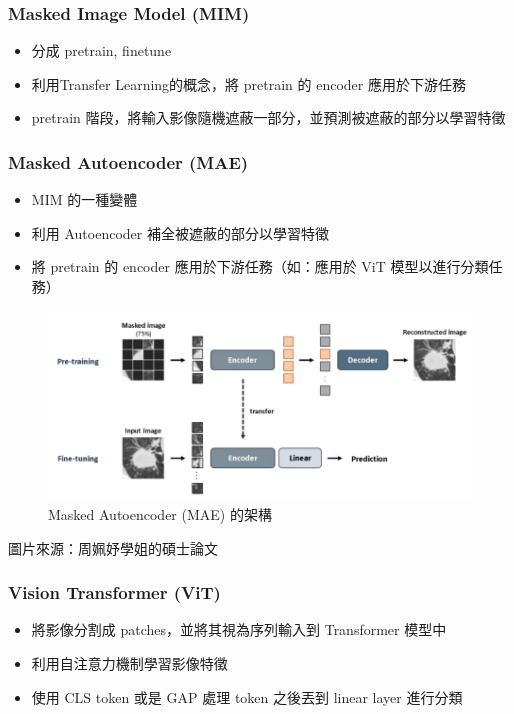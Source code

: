 \documentclass[xcolor=dvipsnames]{beamer}
\begin{document}
    \begin{frame}
        \frametitle{Masked Image Model (MIM)}
        \begin{itemize}
            \item 分成 pretrain, finetune
            \item 利用Transfer Learning的概念，將 pretrain 的 encoder 應用於下游任務
            \item pretrain 階段，將輸入影像隨機遮蔽一部分，並預測被遮蔽的部分以學習特徵
        \end{itemize}
    \end{frame}

    \begin{frame}
        \frametitle{Masked Autoencoder (MAE)}
        \begin{itemize}
            \item MIM 的一種變體
            \item 利用 Autoencoder 補全被遮蔽的部分以學習特徵
            \item 將 pretrain 的 encoder 應用於下游任務（如：應用於 ViT 模型以進行分類任務）
        \end{itemize}
    \end{frame}

    \begin{frame}
        \begin{figure}
            \centering
            \includegraphics[width=1\textwidth]{src/MAE.png}
            \caption{Masked Autoencoder (MAE) 的架構}
            \label{fig:mae_architecture}
        \end{figure}
        圖片來源：周姵妤學姐的碩士論文
    \end{frame}

    \begin{frame}
        \frametitle{Vision Transformer (ViT)}
        \begin{itemize}
            \item 將影像分割成 patches，並將其視為序列輸入到 Transformer 模型中
            \item 利用自注意力機制學習影像特徵
            \item 使用 CLS token 或是 GAP 處理 token 之後丟到 linear layer 進行分類
        \end{itemize}
    \end{frame}
\end{document}

